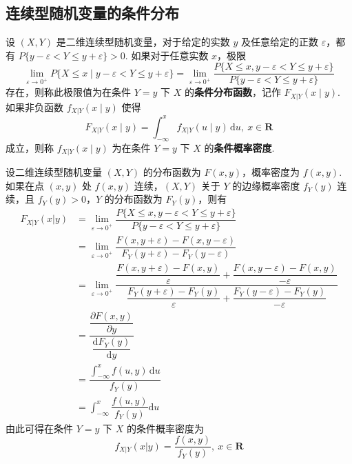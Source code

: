 \subsection{连续型随机变量的条件分布}

\begin{definition}
    设 $(X,Y)$ 是二维连续型随机变量，对于给定的实数 $y$ 及任意给定的正数 $\varepsilon$，都有 $P\{y-\varepsilon < Y \leqslant y+\varepsilon\} > 0$. 如果对于任意实数 $x$，极限
    $$
    \lim_{\varepsilon \to 0^+} P\{X \leqslant x \mid y-\varepsilon < Y \leqslant y+\varepsilon\} = \lim_{\varepsilon \to 0^+} \dfrac{P\{X \leqslant x, y-\varepsilon < Y \leqslant y+\varepsilon\}}{P\{y-\varepsilon < Y \leqslant y+\varepsilon\}}
    $$
    存在，则称此极限值为在条件 $Y=y$ 下 $X$ 的\textbf{条件分布函数}，记作 $F_{X|Y}(x \mid y)$. 如果非负函数 $f_{X|Y}(x \mid y)$ 使得
    $$
    F_{X|Y}(x \mid y) = \int_{-\infty}^x f_{X|Y}(u \mid y) \, \text{d}u,\ x \in \mathbf{R}
    $$
    成立，则称 $f_{X|Y}(x \mid y)$ 为在条件 $Y=y$ 下 $X$ 的\textbf{条件概率密度}.
\end{definition}

设二维连续型随机变量 $(X,Y)$ 的分布函数为 $F(x,y)$，概率密度为 $f(x,y)$. 如果在点 $(x,y)$ 处 $f(x,y)$ 连续，$(X,Y)$ 关于 $Y$ 的边缘概率密度 $f_{Y}(y)$ 连续，且 $f_{Y}(y)>0$，$Y$ 的分布函数为 $F_{Y}(y)$，则有
$$
\begin{aligned}
    F_{X|Y}(x|y) &= \lim_{\varepsilon \to 0^+} \dfrac{P\{X \leqslant x, y-\varepsilon < Y \leqslant y+\varepsilon\}}{P\{y-\varepsilon < Y \leqslant y+\varepsilon\}} \\[0.7em]
    &= \lim_{\varepsilon \to 0^+} \dfrac{F(x, y+\varepsilon) - F(x, y-\varepsilon)}{F_{Y}(y+\varepsilon) - F_{Y}(y-\varepsilon)} \\[0.7em]
    &= \lim_{\varepsilon \to 0^+} \dfrac{\dfrac{F(x, y+\varepsilon) - F(x,y)}{\varepsilon} + \dfrac{F(x, y-\varepsilon) - F(x,y)}{-\varepsilon}}{\dfrac{F_{Y}(y+\varepsilon) - F_{Y}(y)}{\varepsilon} + \dfrac{F_{Y}(y-\varepsilon) - F_{Y}(y)}{-\varepsilon}} \\
    &= \dfrac{\dfrac{\partial F(x,y)}{\partial y}}{\dfrac{\text{d} F_{Y}(y)}{\text{d}y}} \\[1em]
    &= \dfrac{\displaystyle\int_{-\infty}^x f(u,y) \, \text{d}u}{f_{Y}(y)} \\[1em]
    &= \int_{-\infty}^x \dfrac{f(u,y)}{f_{Y}(y)} \text{d}u
\end{aligned}
$$
由此可得在条件 $Y=y$ 下 $X$ 的条件概率密度为
$$
f_{X|Y}(x|y) = \dfrac{f(x,y)}{f_{Y}(y)},\ x \in \mathbf{R}
$$

